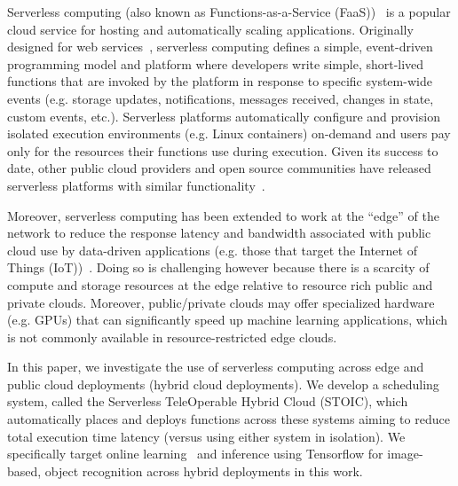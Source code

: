 Serverless computing (also known as Functions-as-a-Ser\-vice
(FaaS))~\cite{ref:aws-lambda,ref:faas3,ref:afunctions-16} is a popular cloud
service for hosting and automatically scaling applications. Originally
designed for web
services~\cite{ref:lambda-webservices,ref:lambda-microservices}, serverless
computing defines a simple, event-driven programming model and platform where
developers write simple, short-lived functions that are invoked by the
platform in response to specific system-wide events (e.g. storage updates,
notifications, messages received, changes in state, custom events, etc.). 
Serverless platforms automatically configure and provision isolated execution environments (e.g. Linux containers) on-demand and users pay only for the resources their functions use during execution. Given its success to date, other public cloud providers and open source communities have released serverless platforms with similar functionality~\cite{ref:gfunctions-16,ref:afunctions-16,ref:openwhisk-16,ref:ironio-16}.

Moreover, serverless computing has been extended to work at the ``edge'' of
the network to reduce the response latency and bandwidth associated with
public cloud use by data-driven applications (e.g.  those that target the
Internet of Things (IoT))~\cite{aws-greengrass,iotedge-web,iothub-web}. 
Doing so is challenging however because there is a
scarcity of compute and storage resources at the edge relative to resource
rich public and private clouds. Moreover, public/private clouds may offer
specialized hardware (e.g. GPUs) that can significantly speed up machine
learning applications, which is not commonly available in resource-restricted
edge clouds.

In this paper, we investigate the use of serverless computing across edge and
public cloud deployments (hybrid cloud deployments). We develop a scheduling
system, called the Serverless TeleOperable Hybrid Cloud (STOIC), which
automatically places and deploys functions across these systems aiming to
reduce total execution time latency (versus using either system in isolation).
We specifically target online learning~\cite{ref:onlinelearning} and inference
using Tensorflow for image-based, object recognition across hybrid deployments
in this work.

